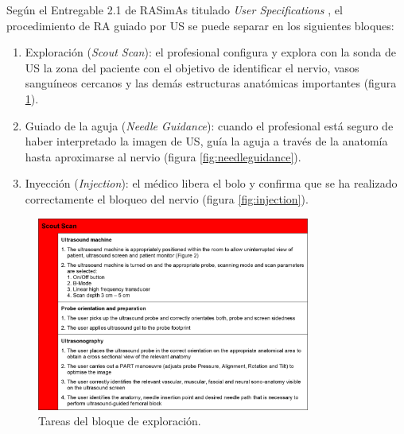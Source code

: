 Según el Entregable 2.1 de \ac{RASimAs} titulado \emph{User Specifications} \cite{ded2.1}, el procedimiento de \ac{RA} guiado por \ac{US} se puede separar en los siguientes bloques:
\begin{enumerate}
    \item Exploración (\emph{Scout Scan}): el profesional configura y explora con la sonda de \ac{US} la zona del paciente con el objetivo de identificar el nervio, vasos sanguíneos cercanos y las demás estructuras anatómicas importantes (figura \ref{fig:scoutscan}). 

    \item Guiado de la aguja (\emph{Needle Guidance}): cuando el profesional está seguro de haber interpretado la imagen de \ac{US}, guía la aguja a través de la anatomía hasta aproximarse al nervio (figura \ref{fig:needleguidance}).  
   
    \item Inyección (\emph{Injection}): el médico libera el bolo y confirma que se ha realizado correctamente el bloqueo del nervio (figura \ref{fig:injection}). 
   
\end{enumerate}
\begin{figure}[bh]
  \centering
    \includegraphics[width=0.8\textwidth]{IMG/scoutscan.png}
    \caption{Tareas del bloque de exploración. }
  \label{fig:scoutscan}
   
\end{figure}
\clearpage
